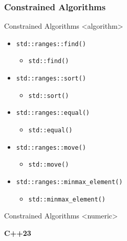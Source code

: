 \subsubsection{Constrained Algorithms}

\begin{frame}{Constrained Algorithms <algorithm>}
    \begin{itemize}
        \item<1-> \texttt{std::ranges::find()}
            \begin{itemize} \item \texttt{std::find()} \end{itemize}
        \item<2-> \texttt{std::ranges::sort()}
            \begin{itemize} \item \texttt{std::sort()} \end{itemize}
        \item<3-> \texttt{std::ranges::equal()}
            \begin{itemize} \item \texttt{std::equal()} \end{itemize}
        \item<3-> \texttt{std::ranges::move()}
            \begin{itemize} \item \texttt{std::move()} \end{itemize}
        \item<4-> \texttt{std::ranges::minmax_element()}
            \begin{itemize} \item \texttt{std::minmax_element()} \end{itemize}
    \end{itemize}
\end{frame}

\begin{frame}{Constrained Algorithms <numeric>}
    \begin{center}
        \textbf{C++23}
    \end{center}
\end{frame}